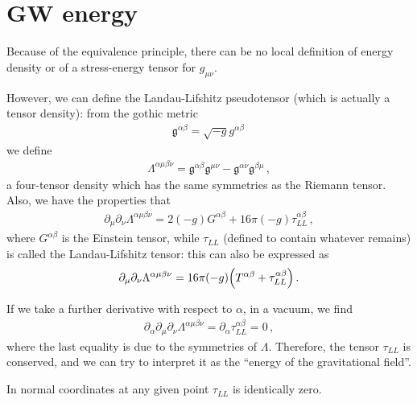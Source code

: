 \documentclass[main.tex]{subfiles}
\begin{document}
\section{GW energy}


Because of the equivalence principle, there can be no local definition of energy density or of a stress-energy tensor for \(g_{\mu \nu }\). 

However, we can define the Landau-Lifshitz pseudotensor (which is actually a tensor density): from the gothic metric 
%
\begin{align}
\mathfrak{g}^{\alpha \beta } = \sqrt{-g } g^{\alpha \beta }
\,
\end{align}
%
we define 
%
\begin{align}
\Lambda^{\alpha \mu \beta \nu } = \mathfrak{g}^{\alpha \beta } \mathfrak{g}^{\mu \nu } - \mathfrak{g}^{\alpha \nu } \mathfrak{g}^{\beta \mu }
\,,
\end{align}
%
a four-tensor density which has the same symmetries as the Riemann tensor. 
Also, we have the properties that 
%
\begin{align}
\partial_{\mu } \partial_{\nu } \Lambda^{\alpha \mu \beta \nu } = 2 (-g) G^{\alpha \beta } + 16 \pi (-g) \tau^{\alpha \beta }_{LL}
\,,
\end{align}
%
where \(G^{\alpha \beta }\) is the Einstein tensor, while \(\tau_{LL}\) (defined to contain whatever remains) is called the Landau-Lifshitz tensor: this can also be expressed as 
%
\begin{align}
\partial_{\mu } \partial_{\nu } \Lambda^{\alpha \mu \beta \nu } =
16 \pi (-g) \qty(T^{\alpha \beta } + \tau_{LL}^{\alpha \beta })
\,.
\end{align}

If we take a further derivative with respect to \(\alpha \), in a vacuum, we find 
%
\begin{align}
\partial_{\alpha } \partial_{\mu } \partial_{\nu } \Lambda^{\alpha \mu \beta \nu } = \partial_{\alpha } \tau_{LL}^{\alpha \beta } = 0
\,,
\end{align}
%
where the last equality is due to the symmetries of \(\Lambda \). Therefore, the tensor \(\tau_{LL}\) is conserved, and we can try to interpret it as the ``energy of the gravitational field''.

In normal coordinates at any given point \(\tau_{LL}\) is identically zero.
\end{document}
